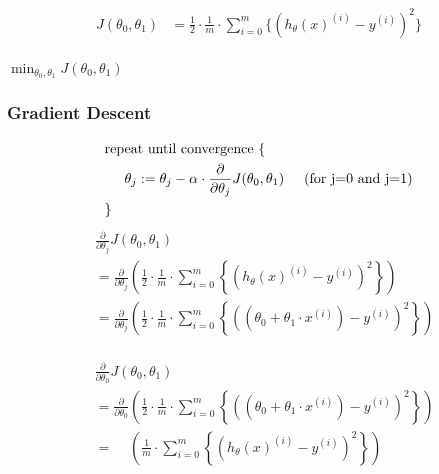 \[
\begin{aligned}
	J(\theta_{0}, \theta_{1}) & = 
	\frac{1}{2}
	\cdot \frac{1}{m}
	\cdot \sum_{i=0}^{m}
	\{
( h_{\theta}(x)^{(i)} - y^{(i)} )^{2}
\} \\
\end{aligned}
\tag{2}
\]

\( \min_{ \theta_0 , \theta_1 } J(\theta_0,\theta_1) \)
\pagebreak
\subsubsectionend
\subsubsection{Gradient Descent}
\label{sssec:gradient_descent}

\[ 
\begin{aligned} 
	& \text{repeat until convergence  }
	\{ \\ 
	& \hspace{0.5cm}
	\theta_j :=
	\theta_j
	- \alpha
	\cdot \frac{\partial}{\partial \theta_j} J(\theta_0,\theta_1) 
	\hspace{0.5cm} 
	\text{(for j=0 and j=1)} 
	\\
	&
	\} \\
\end{aligned}
\]
\[
\begin{aligned}
	&\frac{\partial}{\partial \theta_j}
	J(\theta_{0}, \theta_{1}) \\
	& =
	\frac{\partial}{\partial \theta_j}
	\left(
		\frac{1}{2}
		\cdot \frac{1}{m}
		\cdot \sum_{i=0}^{m}
			\left\{
				\left(
					h_{\theta}(x)^{(i)} - y^{(i)}
				\right)^{2}
			\right\}
	\right)
	\\
	& =
	\frac{\partial}{\partial \theta_j}
	\left(
		\frac{1}{2}
		\cdot \frac{1}{m}
		\cdot \sum_{i=0}^{m}
			\left\{
				\left(
					\left(
						\theta_{0} + \theta_{1} \cdot x^{(i)}
					\right)
					- y^{(i)}
				\right)^{2}
			\right\}
	\right)
	\\
\end{aligned}
\]

\[
\begin{aligned}
	& \frac{\partial}{\partial \theta_0} J(\theta_{0}, \theta_{1}) \\
	& =
	\frac{\partial}{\partial \theta_0}
	\left(
		\frac{1}{2}
		\cdot \frac{1}{m}
		\cdot \sum_{i=0}^{m}
			\left\{
				\left(
					\left(
						\theta_{0} + \theta_{1} \cdot x^{(i)}
					\right)
					- y^{(i)}
				\right)^{2}
			\right\}
	\right)
	\\
	& =
	\phantom{ \frac{\partial}{\partial \theta_0} }
	\left(
		\frac{1}{m}
		\cdot \sum_{i=0}^{m}
			\left\{
				\left(
					h_{\theta}(x)^{(i)} - y^{(i)}
				\right)^{2}
			\right\}
	\right)
	\\
\end{aligned}
\]

